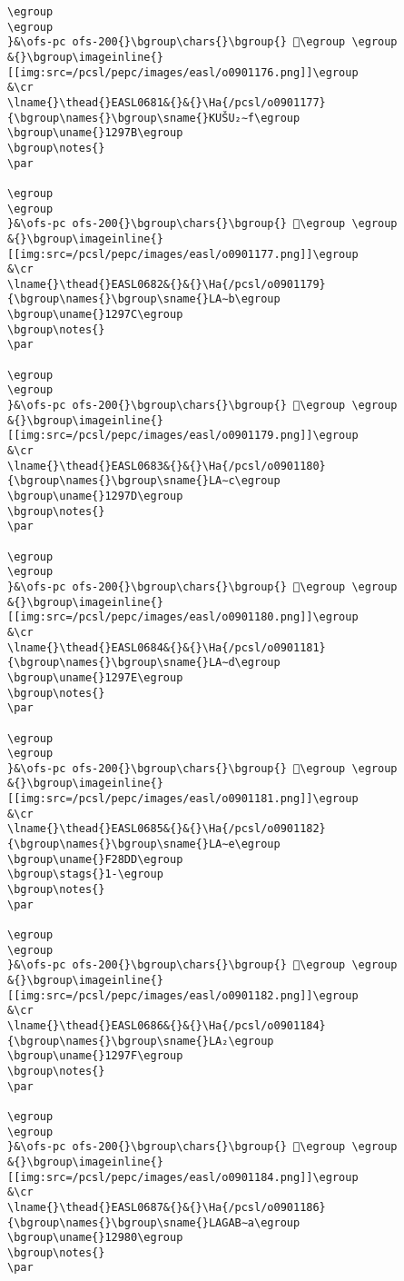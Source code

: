 \begin{verbatim}
\egroup
\egroup
}&\ofs-pc ofs-200{}\bgroup\chars{}\bgroup{} 𒥺\egroup \egroup
&{}\bgroup\imageinline{}[[img:src=/pcsl/pepc/images/easl/o0901176.png]]\egroup
&\cr
\lname{}\thead{}EASL0681&{}&{}\Ha{/pcsl/o0901177}{\bgroup\names{}\bgroup\sname{}KUŠU₂∼f\egroup
\bgroup\uname{}1297B\egroup
\bgroup\notes{}
\par 

\egroup
\egroup
}&\ofs-pc ofs-200{}\bgroup\chars{}\bgroup{} 𒥻\egroup \egroup
&{}\bgroup\imageinline{}[[img:src=/pcsl/pepc/images/easl/o0901177.png]]\egroup
&\cr
\lname{}\thead{}EASL0682&{}&{}\Ha{/pcsl/o0901179}{\bgroup\names{}\bgroup\sname{}LA∼b\egroup
\bgroup\uname{}1297C\egroup
\bgroup\notes{}
\par 

\egroup
\egroup
}&\ofs-pc ofs-200{}\bgroup\chars{}\bgroup{} 𒥼\egroup \egroup
&{}\bgroup\imageinline{}[[img:src=/pcsl/pepc/images/easl/o0901179.png]]\egroup
&\cr
\lname{}\thead{}EASL0683&{}&{}\Ha{/pcsl/o0901180}{\bgroup\names{}\bgroup\sname{}LA∼c\egroup
\bgroup\uname{}1297D\egroup
\bgroup\notes{}
\par 

\egroup
\egroup
}&\ofs-pc ofs-200{}\bgroup\chars{}\bgroup{} 𒥽\egroup \egroup
&{}\bgroup\imageinline{}[[img:src=/pcsl/pepc/images/easl/o0901180.png]]\egroup
&\cr
\lname{}\thead{}EASL0684&{}&{}\Ha{/pcsl/o0901181}{\bgroup\names{}\bgroup\sname{}LA∼d\egroup
\bgroup\uname{}1297E\egroup
\bgroup\notes{}
\par 

\egroup
\egroup
}&\ofs-pc ofs-200{}\bgroup\chars{}\bgroup{} 𒥾\egroup \egroup
&{}\bgroup\imageinline{}[[img:src=/pcsl/pepc/images/easl/o0901181.png]]\egroup
&\cr
\lname{}\thead{}EASL0685&{}&{}\Ha{/pcsl/o0901182}{\bgroup\names{}\bgroup\sname{}LA∼e\egroup
\bgroup\uname{}F28DD\egroup
\bgroup\stags{}1-\egroup
\bgroup\notes{}
\par 

\egroup
\egroup
}&\ofs-pc ofs-200{}\bgroup\chars{}\bgroup{} 󲣝\egroup \egroup
&{}\bgroup\imageinline{}[[img:src=/pcsl/pepc/images/easl/o0901182.png]]\egroup
&\cr
\lname{}\thead{}EASL0686&{}&{}\Ha{/pcsl/o0901184}{\bgroup\names{}\bgroup\sname{}LA₂\egroup
\bgroup\uname{}1297F\egroup
\bgroup\notes{}
\par 

\egroup
\egroup
}&\ofs-pc ofs-200{}\bgroup\chars{}\bgroup{} 𒥿\egroup \egroup
&{}\bgroup\imageinline{}[[img:src=/pcsl/pepc/images/easl/o0901184.png]]\egroup
&\cr
\lname{}\thead{}EASL0687&{}&{}\Ha{/pcsl/o0901186}{\bgroup\names{}\bgroup\sname{}LAGAB∼a\egroup
\bgroup\uname{}12980\egroup
\bgroup\notes{}
\par 


\end{verbatim}
